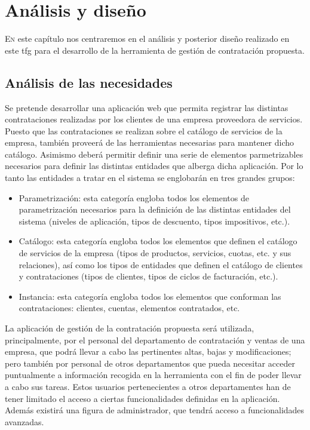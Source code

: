 \chapter{Análisis y diseño}
\label{chap:analisis-disenho}


\lettrine{E}{n} este capítulo nos centraremos en el análisis y posterior diseño realizado en este \acrshort{tfg} para el desarrollo de la herramienta de gestión de contratación propuesta.

\section{Análisis de las necesidades}
\label{sec:analisis}
Se pretende desarrollar una aplicación web que permita registrar las distintas contrataciones realizadas por los clientes de una empresa proveedora de servicios. Puesto que las contrataciones se realizan sobre el catálogo de servicios de la empresa, también proveerá de las herramientas necesarias para mantener dicho catálogo. Asimismo deberá permitir definir una serie de elementos parmetrizables necesarios para definir las distintas entidades que alberga dicha aplicación. Por lo tanto las entidades a tratar en el sistema se englobarán en tres grandes grupos:
\begin{itemize}
\item Parametrización: esta categoría engloba todos los elementos de parametrización necesarios para la definición de las distintas entidades del sistema (niveles de aplicación, tipos de descuento, tipos impositivos, etc.).
\item Catálogo: esta categoría engloba todos los elementos que definen el catálogo de servicios de la empresa (tipos de productos, servicios, cuotas, etc. y sus relaciones), así como los tipos de entidades que definen el catálogo de clientes y contrataciones (tipos de clientes, tipos de ciclos de facturación, etc.).
\item Instancia: esta categoría engloba todos los elementos que conforman las contrataciones: clientes, cuentas, elementos contratados, etc.
\end{itemize}


La aplicación de gestión de la contratación propuesta será utilizada, principalmente, por el personal del departamento de contratación y ventas de una empresa, que podrá llevar a cabo las pertinentes altas, bajas y modificaciones; pero también por personal de otros departamentos que pueda necesitar acceder puntualmente a información recogida en la herramienta con el fin de poder llevar a cabo sus tareas. Estos usuarios pertenecientes a otros departamentes han de tener limitado el acceso a ciertas funcionalidades definidas en la aplicación. Además existirá una figura de administrador, que tendrá acceso a funcionalidades avanzadas.


